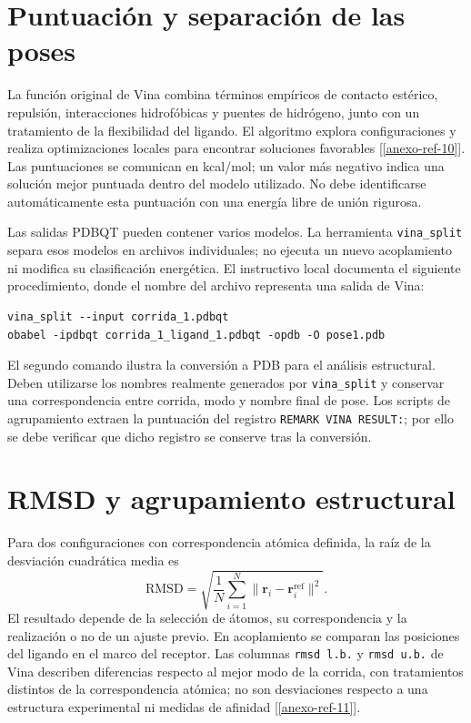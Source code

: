 \documentclass[12 pt, letter, oneside]{book}
\begin{document}
\section{Puntuación y separación de las poses}
La función original de Vina combina términos empíricos de contacto estérico, repulsión, interacciones hidrofóbicas y puentes de hidrógeno, junto con un tratamiento de la flexibilidad del ligando. El algoritmo explora configuraciones y realiza optimizaciones locales para encontrar soluciones favorables [\ref{anexo-ref-10}]. Las puntuaciones se comunican en kcal/mol; un valor más negativo indica una solución mejor puntuada dentro del modelo utilizado. No debe identificarse automáticamente esta puntuación con una energía libre de unión rigurosa.

Las salidas PDBQT pueden contener varios modelos. La herramienta \texttt{vina\_split} separa esos modelos en archivos individuales; no ejecuta un nuevo acoplamiento ni modifica su clasificación energética. El instructivo local documenta el siguiente procedimiento, donde el nombre del archivo representa una salida de Vina:
\begin{lstlisting}[basicstyle=\ttfamily\small,breaklines=true]
vina_split --input corrida_1.pdbqt
obabel -ipdbqt corrida_1_ligand_1.pdbqt -opdb -O pose1.pdb
\end{lstlisting}
El segundo comando ilustra la conversión a PDB para el análisis estructural. Deben utilizarse los nombres realmente generados por \texttt{vina\_split} y conservar una correspondencia entre corrida, modo y nombre final de pose. Los scripts de agrupamiento extraen la puntuación del registro \texttt{REMARK VINA RESULT:}; por ello se debe verificar que dicho registro se conserve tras la conversión.

\section{RMSD y agrupamiento estructural}
Para dos configuraciones con correspondencia atómica definida, la raíz de la desviación cuadrática media es
\begin{equation}
 \mathrm{RMSD}=\sqrt{\frac{1}{N}\sum_{i=1}^{N}\lVert\mathbf r_i-\mathbf r_i^{\mathrm{ref}}\rVert^2}.
\end{equation}
El resultado depende de la selección de átomos, su correspondencia y la realización o no de un ajuste previo. En acoplamiento se comparan las posiciones del ligando en el marco del receptor. Las columnas \texttt{rmsd l.b.} y \texttt{rmsd u.b.} de Vina describen diferencias respecto al mejor modo de la corrida, con tratamientos distintos de la correspondencia atómica; no son desviaciones respecto a una estructura experimental ni medidas de afinidad [\ref{anexo-ref-11}].
\end{document}
